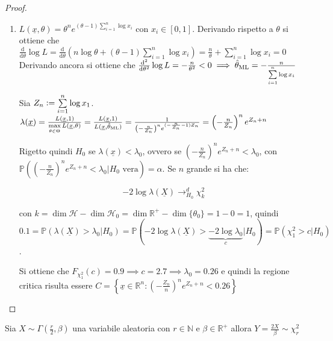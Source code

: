 \documentclass[hidelinks, 10pt]{report}
\begin{document}
\begin{proof}
\begin{enumerate}
Una soluzione approssimata per $ h(c_{2}) = 0 $ \`e data da $ c_{2} = 0.9196 $, quindi $ c_{1} = c_{2} - 0.9 = 0.0196 $ e quindi $ C = \{ x \in \mathbb{R} : x < 0.0196 \lor x > 0.9196 \} $
\item $ L (\underline{x}, \theta) = \theta^{n} e^{(\theta - 1) \sum\limits_{i = 1}^{n} \log x_{i}} $ con $ x_{i} \in [0,1] $. Derivando rispetto a $ \theta $ si ottiene che$ \frac{\mathrm{d}}{\mathrm{d} \theta} \log L = \frac{\mathrm{d}}{\mathrm{d} \theta} (n \log \theta + (\theta - 1) \sum\limits_{i = 1}^{n} \log x_{i}) = \frac{n}{\theta} + \sum\limits_{i = 1}^{n} \log x_{i} = 0 $ Derivando ancora si ottiene che $ \frac{\mathrm{d}^{2}}{\mathrm{d} \theta^{2}} \log L = - \frac{n}{\theta^{2}} < 0 \implies \hat{\theta}_{\text{ML}} = - \frac{n}{\sum\limits_{i = 1}^{n} \log x_{i}} $

Sia $ Z_{n} \vcentcolon= \sum\limits_{i = 1}^{n} \log x_{1} $. $ \lambda (\underline{x}) = \frac{L(\underline{x}, 1)}{\max\limits_{\theta \in \Theta} L(\underline{x}, \theta)} = \frac{L(\underline{x}, 1)}{L(\underline{x}, \hat{\theta}_{\text{ML}})} = \frac{1}{\left( -\frac{n}{Z_{n}} \right)^{n} e^{(-\frac{n}{Z_{n}} - 1) Z_{n}}} = \left( -\frac{n}{Z_{n}} \right)^{n} e^{Z_{n} + n} $

Rigetto quindi $ H_{0} $ se $ \lambda(\underline{x}) < \lambda_{0} $, ovvero se $ \left( -\frac{n}{Z_{n}} \right)^{n} e^{Z_{n} + n} < \lambda_{0} $, con $ {\mathbb{P} \left( \left( -\frac{n}{Z_{n}} \right)^{n} e^{Z_{n} + n} < \lambda_{0} \vert H_{0} \text{ vera} \right) = \alpha} $. Se $ n $ grande si ha che:

\[ - 2 \log \lambda(\underline{X}) \mathop{\to}^{d}_{H_{0}} \chi^{2}_{k} \]

con $ k = \dim \mathcal{H} - \dim \mathcal{H}_{0} = \dim \mathbb{R}^{+} - \dim \{ \theta_{0} \} = 1 - 0 = 1 $, quindi $ 0.1 = \mathbb{P} (\lambda(\underline{X}) > \lambda_0 \vert H_0) = \mathbb{P} (-2 \log \lambda(\underline{X}) > \underbrace{- 2 \log \lambda_{0}}_{c} \vert H_0) = \mathbb{P}(\chi^{2}_{1} > c \vert H_{0}) $.

Si ottiene che $ F_{\chi^{2}_{1}} (c) = 0.9 \implies c = 2.7 \implies \lambda_{0} = 0.26 $ e quindi la regione critica risulta essere $ C = \left\{ \underline{x} \in \mathbb{R}^{n} : \left( - \frac{Z_{n}}{n} \right)^{n} e^{Z_{n} + n} < 0.26 \right\} $
\end{enumerate}
\end{proof}

\begin{thm}
Sia $ X \sim \Gamma \left( \frac{r}{2}, \beta \right) $ una variabile aleatoria con $ r \in \mathbb{N} $ e $ \beta \in \mathbb{R}^{+} $ allora $ Y = \frac{2X}{\beta} \sim \chi^{2}_{r} $ 
\end{thm}
\end{document}
